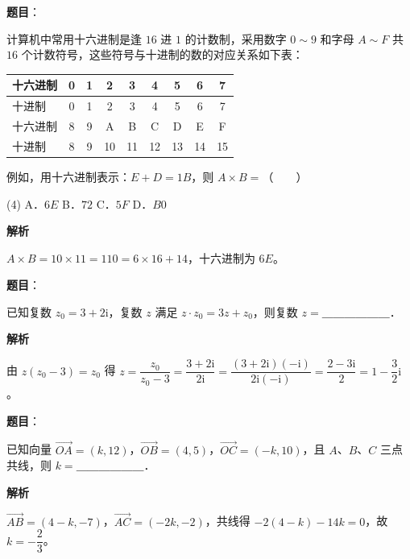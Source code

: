 \begin{answer}

\textbf{题目}：

计算机中常用十六进制是逢 $16$ 进 $1$ 的计数制，采用数字 $0 \sim 9$ 和字母 $A \sim F$ 共 $16$ 个计数符号，这些符号与十进制的数的对应关系如下表：

\begin{center}
\begingroup\setlength{\tabcolsep}{4pt}
\begin{tabular}{lcccccccc}
\toprule
十六进制 & 0 & 1 & 2 & 3 & 4 & 5 & 6 & 7 \\
\midrule
十进制 & 0 & 1 & 2 & 3 & 4 & 5 & 6 & 7 \\
十六进制 & 8 & 9 & A & B & C & D & E & F \\
十进制 & 8 & 9 & 10 & 11 & 12 & 13 & 14 & 15 \\
\bottomrule
\end{tabular}
\endgroup
\end{center}

例如，用十六进制表示：$E + D = 1B$，则 $A \times B =$\mbox{（　　）}

\begin{gkopts}(4)
\task A．$6E$
\task B．$72$
\task C．$5F$
\task D．$B0$
\end{gkopts}

\textbf{解析}

$A \times B = 10 \times 11 = 110 = 6\times 16 + 14$，十六进制为 $6E$。


\end{answer}
\begin{answer}

\textbf{题目}：

已知复数 $z_0 = 3 + 2\mathrm{i}$，复数 $z$ 满足 $z \cdot z_0 = 3z + z_0$，则复数 $z =$＿＿＿＿＿＿．

\textbf{解析}

由 $z(z_0 - 3) = z_0$ 得 $z = \dfrac{z_0}{z_0 - 3} = \dfrac{3 + 2\mathrm{i}}{2\mathrm{i}} = \dfrac{(3 + 2\mathrm{i})(-\mathrm{i})}{2\mathrm{i}(-\mathrm{i})} = \dfrac{2 - 3\mathrm{i}}{2} = 1 - \dfrac{3}{2}\mathrm{i}$。


\end{answer}
\begin{answer}

\textbf{题目}：

已知向量 $\overrightarrow{OA} = (k, 12)$，$\overrightarrow{OB} = (4, 5)$，$\overrightarrow{OC} = (-k, 10)$，且 $A$、$B$、$C$ 三点共线，则 $k =$＿＿＿＿＿＿．

\textbf{解析}

$\overrightarrow{AB} = (4-k, -7)$，$\overrightarrow{AC} = (-2k, -2)$，共线得 $-2(4-k) - 14k = 0$，故 $k = -\dfrac{2}{3}$。


\end{answer}
